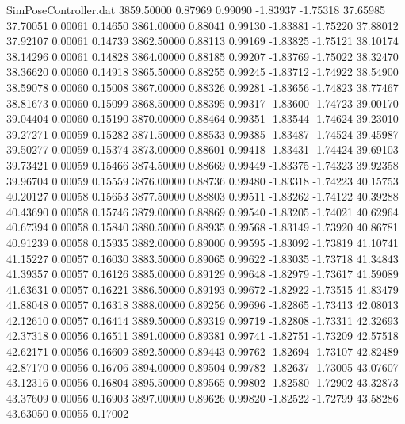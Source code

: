 \begin{filecontents}{SimPoseController.dat}
3859.50000    0.87969    0.99090    -1.83937   -1.75318   37.65985   37.70051    0.00061    0.14650
3861.00000    0.88041    0.99130    -1.83881   -1.75220   37.88012   37.92107    0.00061    0.14739
3862.50000    0.88113    0.99169    -1.83825   -1.75121   38.10174   38.14296    0.00061    0.14828
3864.00000    0.88185    0.99207    -1.83769   -1.75022   38.32470   38.36620    0.00060    0.14918
3865.50000    0.88255    0.99245    -1.83712   -1.74922   38.54900   38.59078    0.00060    0.15008
3867.00000    0.88326    0.99281    -1.83656   -1.74823   38.77467   38.81673    0.00060    0.15099
3868.50000    0.88395    0.99317    -1.83600   -1.74723   39.00170   39.04404    0.00060    0.15190
3870.00000    0.88464    0.99351    -1.83544   -1.74624   39.23010   39.27271    0.00059    0.15282
3871.50000    0.88533    0.99385    -1.83487   -1.74524   39.45987   39.50277    0.00059    0.15374
3873.00000    0.88601    0.99418    -1.83431   -1.74424   39.69103   39.73421    0.00059    0.15466
3874.50000    0.88669    0.99449    -1.83375   -1.74323   39.92358   39.96704    0.00059    0.15559
3876.00000    0.88736    0.99480    -1.83318   -1.74223   40.15753   40.20127    0.00058    0.15653
3877.50000    0.88803    0.99511    -1.83262   -1.74122   40.39288   40.43690    0.00058    0.15746
3879.00000    0.88869    0.99540    -1.83205   -1.74021   40.62964   40.67394    0.00058    0.15840
3880.50000    0.88935    0.99568    -1.83149   -1.73920   40.86781   40.91239    0.00058    0.15935
3882.00000    0.89000    0.99595    -1.83092   -1.73819   41.10741   41.15227    0.00057    0.16030
3883.50000    0.89065    0.99622    -1.83035   -1.73718   41.34843   41.39357    0.00057    0.16126
3885.00000    0.89129    0.99648    -1.82979   -1.73617   41.59089   41.63631    0.00057    0.16221
3886.50000    0.89193    0.99672    -1.82922   -1.73515   41.83479   41.88048    0.00057    0.16318
3888.00000    0.89256    0.99696    -1.82865   -1.73413   42.08013   42.12610    0.00057    0.16414
3889.50000    0.89319    0.99719    -1.82808   -1.73311   42.32693   42.37318    0.00056    0.16511
3891.00000    0.89381    0.99741    -1.82751   -1.73209   42.57518   42.62171    0.00056    0.16609
3892.50000    0.89443    0.99762    -1.82694   -1.73107   42.82489   42.87170    0.00056    0.16706
3894.00000    0.89504    0.99782    -1.82637   -1.73005   43.07607   43.12316    0.00056    0.16804
3895.50000    0.89565    0.99802    -1.82580   -1.72902   43.32873   43.37609    0.00056    0.16903
3897.00000    0.89626    0.99820    -1.82522   -1.72799   43.58286   43.63050    0.00055    0.17002

\end{filecontents}
